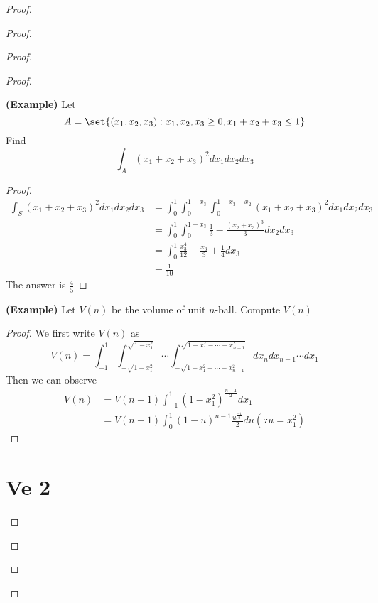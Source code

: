 \documentclass{report}
\begin{document}
\begin{proof}
\begin{proof}
\begin{proof}
\begin{proof}
\begin{theorem}
\label{8.6.4}
\textbf{(Example)} Let 
\begin{equation}
A=\set{(x_1,x_2,x_3):x_1,x_2,x_3 \geq 0, x_1+x_2+x_3\leq 1}
\end{equation}
Find
\begin{equation}
\int_A (x_1+x_2+x_3)^2 dx_1dx_2dx_3
\end{equation}
\end{theorem}
\begin{proof}
\begin{align}
\int_S(x_1+x_2+x_3)^2dx_1dx_2dx_3&=\int_0^1 \int_0^{1-x_3}\int_0^{1-x_3-x_2}(x_1+x_2+x_3)^2dx_1dx_2dx_3\\
&=\int_0^1\int_0^{1-x_3}\frac{1}{3}-\frac{(x_2+x_3)^3}{3}dx_2dx_3\\
&=\int_0^1 \frac{x_3^4}{12}-\frac{x_3}{3}+\frac{1}{4}dx_3\\
&=\frac{1}{10}
\end{align}
The answer is $\frac{4}{5}$
\end{proof}
\begin{theorem}
\label{8.6.5}
\textbf{(Example)} Let $V(n)$ be the volume of unit $n$-ball. Compute $V(n)$
\end{theorem}
\begin{proof}
We first write $V(n)$ as
 \begin{equation}
V(n)=\int_{-1}^1\int_{-\sqrt{1-x_1^2}}^{\sqrt{1-x_1^2}}\cdots \int^{\sqrt{1-x_1^2-\cdots -x_{n-1}^2} }_{-\sqrt{1-x_1^2-\cdots -x_{n-1}^2} }dx_ndx_{n-1}\cdots dx_1
\end{equation}
Then we can observe
\begin{align}
  V(n)&=V(n-1)\int_{-1}^1 (1-x_1^2)^{\frac{n-1}{2}}dx_1\\
  &=V(n-1)\int_0^1 (1-u)^{n-1}\frac{u^{\frac{-1}{2}}}{2}du (\because u=x_1^2)
\end{align}
\end{proof}
\chapter{Ve 2}

\end{proof}
\end{proof}
\end{proof}
\end{proof}
\end{document}
